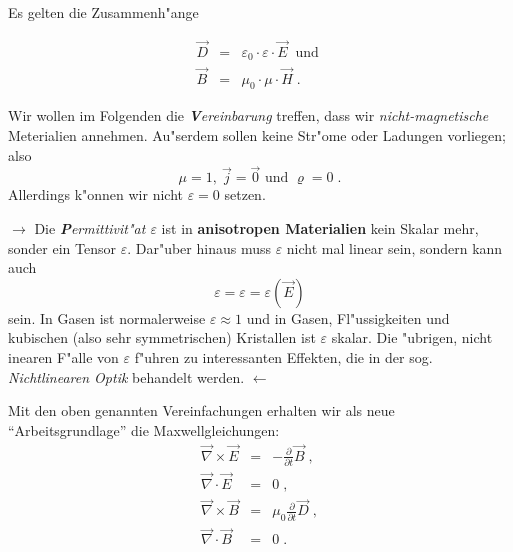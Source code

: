 \documentclass[twoside,a4paper]{book}
\newcommand{\st}[1]{{\slshape \textbf #1}}
\newcommand{\Ve}[1]{\ensuremath{\vec{#1}}}
\newcommand{\Ten}[1]{\ensuremath{{\mathcal{#1}}}}
\newcommand{\Rot}{\ensuremath{\Ve \nabla \times }}
\newcommand{\Div}{\ensuremath{\Ve \nabla \cdot }}
\newenvironment*{Einschub}[0]{$\rightarrow$ \indent}{$\leftarrow$}
\begin{document}
Es gelten die Zusammenh"ange
\begin{Wichtig}
\begin{eqnarray}
   \label{eq:7}
   \vec D &=& \varepsilon_0 \cdot \varepsilon \cdot \vec E  ~ \text{ und
   }\\
   \label{eq:8}
   \vec B &=& \mu_0 \cdot \mu \cdot \vec H \;.
\end{eqnarray}
\end{Wichtig}


Wir wollen im Folgenden die \st{Vereinbarung} treffen, dass wir
\emph{nicht-magnetische} Meterialien annehmen. Au"serdem sollen keine
Str"ome oder Ladungen vorliegen; also
\begin{equation}
   \label{eq:6}
   \mu = 1, ~ \vec j = \vec 0 \text{ und } \varrho = 0 \;.
\end{equation}
Allerdings k"onnen wir nicht $\varepsilon=0$ setzen.


\begin{Einschub}
Die \st{Permittivit"at $\varepsilon$} ist in \textbf{anisotropen Materialien} kein Skalar mehr, sonder ein
Tensor $\Ten \varepsilon$. Dar"uber hinaus muss $\Ten \varepsilon$
nicht mal linear sein, sondern kann auch
\begin{equation*}
   \varepsilon = \Ten \varepsilon = \Ten \varepsilon(\vec E)
\end{equation*}
sein. In Gasen ist normalerweise $\varepsilon \approx 1$ und in Gasen,
Fl"ussigkeiten und kubischen (also sehr symmetrischen) Kristallen ist
$\varepsilon$ skalar. Die "ubrigen, nicht inearen F"alle von
$\varepsilon$ f"uhren zu interessanten Effekten, die in der
sog. \emph{Nichtlinearen Optik} behandelt
werden.   
\end{Einschub}


Mit den oben genannten Vereinfachungen erhalten wir als neue
"`Arbeitsgrundlage"' die Maxwellgleichungen:
\begin{eqnarray}
   \label{eq:9}
   \Rot \vec E &=& - \frac{\partial }{\partial t}\vec B \;,\\
\label{eq:5}
\Div \vec E &=& 0 \;,\\
\label{eq:10}
\Rot \vec B &=& \mu_0 \frac{\partial }{\partial t}\vec D \;,\\
\label{eq:11}
\Div \vec B &=& 0 \;.
\end{eqnarray}
\end{document}
